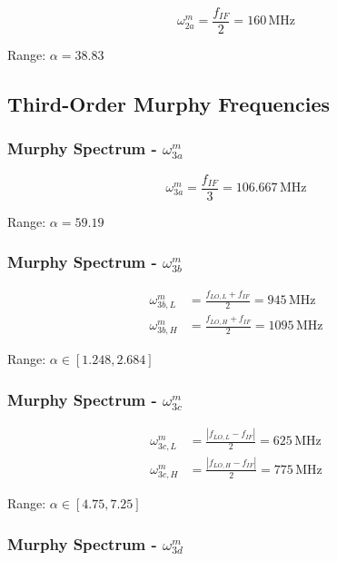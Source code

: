 \begin{equation}
\omega_{2a}^m = \frac{f_{IF}}{2} = 160\,\text{MHz}
\end{equation}

Range: $\alpha = 38.83$

\subsection{Third-Order Murphy Frequencies}

\subsubsection{Murphy Spectrum - $\omega_{3a}^m$}
\label{eq:3a}

\begin{equation}
\omega_{3a}^m = \frac{f_{IF}}{3} = 106.667\,\text{MHz}
\end{equation}

Range: $\alpha = 59.19$

\subsubsection{Murphy Spectrum - $\omega_{3b}^m$}
\label{eq:3b}

\begin{align}
\omega_{3b,L}^m &= \frac{f_{LO,L} + f_{IF}}{2} = 945\,\text{MHz} \\
\omega_{3b,H}^m &= \frac{f_{LO,H} + f_{IF}}{2} = 1095\,\text{MHz}
\end{align}

Range: $\alpha \in [1.248, 2.684]$

\subsubsection{Murphy Spectrum - $\omega_{3c}^m$}
\label{eq:3c}

\begin{align}
\omega_{3c,L}^m &= \frac{|f_{LO,L} - f_{IF}|}{2} = 625\,\text{MHz} \\
\omega_{3c,H}^m &= \frac{|f_{LO,H} - f_{IF}|}{2} = 775\,\text{MHz}
\end{align}

Range: $\alpha \in [4.75, 7.25]$

\subsubsection{Murphy Spectrum - $\omega_{3d}^m$}
\label{eq:3d}

